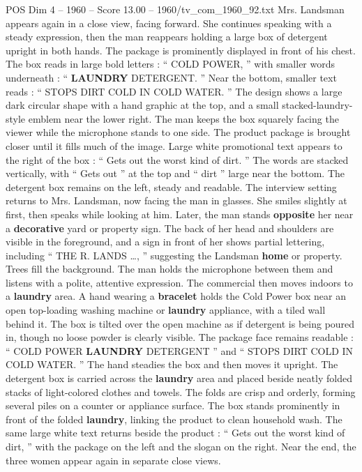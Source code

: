 \begin{textsample}{POS Dim 4 – 1960 – Score 13.00 – 1960/tv\_com\_1960\_92.txt}
Mrs.
Landsman appears again in a close view, facing forward.
She continues speaking with a steady expression, then the man reappears holding a large box of detergent upright in both hands.
The package is prominently displayed in front of his chest.
The box reads in large bold letters : “ COLD POWER, ” with smaller words underneath : “ \textbf{LAUNDRY} DETERGENT. ” Near the bottom, smaller text reads : “ STOPS DIRT COLD IN COLD WATER. ” The design shows a large dark circular shape with a hand graphic at the top, and a small stacked-laundry-style emblem near the lower right.
The man keeps the box squarely facing the viewer while the microphone stands to one side.
The product package is brought closer until it fills much of the image.
Large white promotional text appears to the right of the box : “ Gets out the worst kind of dirt. ” The words are stacked vertically, with “ Gets out ” at the top and “ dirt ” large near the bottom.
The detergent box remains on the left, steady and readable.
The interview setting returns to Mrs.
Landsman, now facing the man in glasses.
She smiles slightly at first, then speaks while looking at him.
Later, the man stands \textbf{opposite} her near a \textbf{decorative} yard or property sign.
The back of her head and shoulders are visible in the foreground, and a sign in front of her shows partial lettering, including “ THE R.
LANDS …, ” suggesting the Landsman \textbf{home} or property.
Trees fill the background.
The man holds the microphone between them and listens with a polite, attentive expression.
The commercial then moves indoors to a \textbf{laundry} area.
A hand wearing a \textbf{bracelet} holds the Cold Power box near an open top-loading washing machine or \textbf{laundry} appliance, with a tiled wall behind it.
The box is tilted over the open machine as if detergent is being poured in, though no loose powder is clearly visible.
The package face remains readable : “ COLD POWER \textbf{LAUNDRY} DETERGENT ” and “ STOPS DIRT COLD IN COLD WATER. ” The hand steadies the box and then moves it upright.
The detergent box is carried across the \textbf{laundry} area and placed beside neatly folded stacks of light-colored clothes and towels.
The folds are crisp and orderly, forming several piles on a counter or appliance surface.
The box stands prominently in front of the folded \textbf{laundry}, linking the product to clean household wash.
The same large white text returns beside the product : “ Gets out the worst kind of dirt, ” with the package on the left and the slogan on the right.
Near the end, the three women appear again in separate close views.

\end{textsample}
